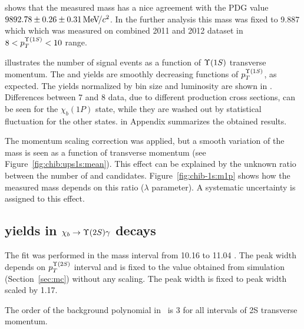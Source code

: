 


 shows that the measured \chiboneOneP mass
has a nice agreement with the PDG value $9892.78 \pm 0.26 \pm 0.31 {\mathrm{\,Me\kern -0.1em V\!/}c^2}$. In
the further analysis this mass was fixed to 9.887 \gevcc which which was
measured on combined 2011 and 2012 dataset in $8<p_T^{\Y1S}<10$ range.


 illustrates the number of signal events as
a function of $\Y1S$ transverse momentum. The \chibOneP and \chibThreeP yields
are smoothly decreasing functions of $p_T^{\Y1S}$, as expected. The yields
normalized by bin size and luminosity are shown in
. Differences between 7 and 8\tev
data, due to different production cross sections, can be seen for the
$\chi_b(1P)$ state, while they are washed out by statistical fluctuation for
the other states.  in Appendix summarizes the
obtained results.



The momentum scaling correction was applied, but a smooth variation of the
\chiboneOneP mass is seen as a function of transverse momentum (see
Figure~\ref{fig:chib:ups1s:mean}). This effect can be explained by the unknown
ratio between the number of \chiboneOneP and \chiboneTwoP candidates.
Figure~\ref{fig:chib-1s:m1p} shows how the measured mass depends on this ratio
($\lambda$ parameter). A systematic uncertainty is assigned to this effect.





\subsection{\texorpdfstring{\chib}{xb} yields in
	\texorpdfstring{$\chib \to \Y2S \gamma$}{xb --> Y(2S) gamma} decays}
\label{sec:chib:ups2s:fit}

The fit was performed in the mass interval from 10.16 \gevcc to 11.04 \gevcc.
The  \chiboneTwoP peak width depends on $p_T^{\Y2S}$ interval and is fixed to
the value obtained from simulation (Section~\ref{sec:mc}) without any scaling.
The \chiboneThreeP peak width is fixed to \chiboneTwoP peak width scaled by
1.17.


The order of the background polynomial in~ is 3 for all
intervals of \Y2S transverse momentum.


